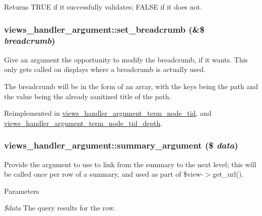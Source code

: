\begin{DoxyReturn}{Returns}
TRUE if it successfully validates; FALSE if it does not. 
\end{DoxyReturn}
\hypertarget{classviews__handler__argument_a06263489052be463efd3c4afdf73851d}{
\subsubsection[{set\_\-breadcrumb}]{\setlength{\rightskip}{0pt plus 5cm}views\_\-handler\_\-argument::set\_\-breadcrumb (\&\$ {\em breadcrumb})}}
\label{classviews__handler__argument_a06263489052be463efd3c4afdf73851d}
Give an argument the opportunity to modify the breadcrumb, if it wants. This only gets called on displays where a breadcrumb is actually used.

The breadcrumb will be in the form of an array, with the keys being the path and the value being the already sanitized title of the path. 

Reimplemented in \hyperlink{classviews__handler__argument__term__node__tid_aef9753aafd176e2e63c4a99be1177175}{views\_\-handler\_\-argument\_\-term\_\-node\_\-tid}, and \hyperlink{classviews__handler__argument__term__node__tid__depth_a4cbf578a06b12655b9a5aa8fcee4097d}{views\_\-handler\_\-argument\_\-term\_\-node\_\-tid\_\-depth}.\hypertarget{classviews__handler__argument_aad03acefdb44288d7e6c7793bc33f66c}{
\subsubsection[{summary\_\-argument}]{\setlength{\rightskip}{0pt plus 5cm}views\_\-handler\_\-argument::summary\_\-argument (\$ {\em data})}}
\label{classviews__handler__argument_aad03acefdb44288d7e6c7793bc33f66c}
Provide the argument to use to link from the summary to the next level; this will be called once per row of a summary, and used as part of \$view-\/$>$get\_\-url().


\begin{DoxyParams}{Parameters}
\item[{\em \$data}]The query results for the row. \end{DoxyParams}


